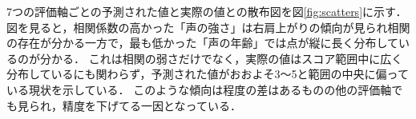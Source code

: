 7つの評価軸ごとの予測された値と実際の値との散布図を図\ref{fig:scatters}に示す．
図を見ると，相関係数の高かった「声の強さ」は右肩上がりの傾向が見られ相関の存在が分かる一方で，最も低かった「声の年齢」では点が縦に長く分布しているのが分かる．
これは相関の弱さだけでなく，実際の値はスコア範囲中に広く分布しているにも関わらず，予測された値がおおよそ3〜5と範囲の中央に偏っている現状を示している．
このような傾向は程度の差はあるものの他の評価軸でも見られ，精度を下げてる一因となっている．

\begin{figure}[htb]
  \centering
  \hspace{3mm}
  \vspace{3mm}
  \hspace{3mm}

\end{figure}
